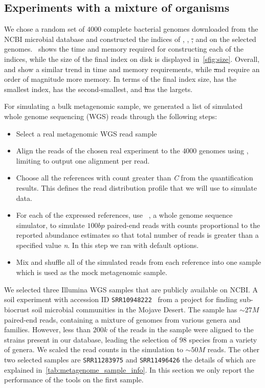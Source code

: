 \subsection{Experiments with a mixture of organisms}

We chose a random set of $4000$ complete bacterial genomes
downloaded from the NCBI microbial database and constructed the indices of \puffaligner, \bt, \st, and 
\debga on the selected genomes.~ shows the time and memory required for constructing 
each of the indices, while the size of the final index on disk is displayed in~\cref{sfig:size}.
Overall, \puffaligner and \bt show a similar trend in time and memory requirements, while \st and \debga 
require an order of magnitude more memory. In terms of the final index size, \bt has the smallest index, 
\puffaligner has the second-smallest, and \st has the largets.

For simulating a bulk metagenomic sample, we generated a list of
simulated whole genome sequencing (WGS) reads through the following steps:
\begin{itemize}
    \item Select a real metagenomic WGS read sample
    \item Align the reads of the chosen real experiment
    to the $4000$ genomes using \bt, limiting \bt to output one alignment per read.
    \item Choose all the references with count greater than \emph{C} from the quantification results.
    This defines the read distribution profile that we will use to simulate data.
    \item For each of the expressed references, use \mason~\citep{holtgrewe2010mason}, a whole genome 
    sequence simulator, to simulate $100bp$ paired-end reads with counts proportional to the reported 
    abundance estimates so that total number of reads is greater than a specified value \emph{n}.
    In this step we ran \mason with default options.
    \item Mix and shuffle all of the simulated reads from each reference into one sample which is used as 
    the mock metagenomic sample.
\end{itemize}

We selected three Illumina WGS samples that are publicly available on NCBI.
A soil experiment with accession ID \texttt{SRR10948222}~\citep{SRR10948222}
from a project for finding sub-biocrust soil microbial communities in the Mojave Desert.
The sample has $\sim27M$ paired-end reads, containing a mixture of genomes from various genera and families.
However, less than $200k$ of the reads in the sample were aligned to the strains present in our database,
leading the selection of $98$ species from a variety of genera.
We scaled the read counts in the simulation to $\sim50M$ reads. The other two selected samples are 
\texttt{SRR11283975} and \texttt{SRR11496426}
the details of which are explained in~\cref{tab:metagenome_sample_info}.
In this section we only report the performance of the tools on the first sample.

